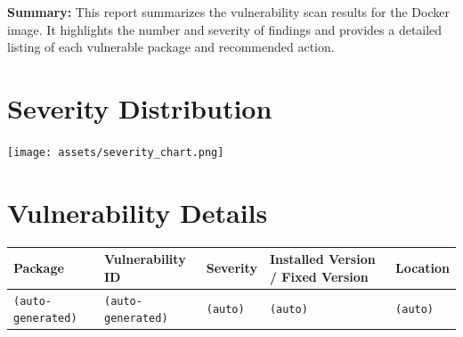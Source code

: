 \documentclass[10pt]{article}
\begin{document}
\vspace{6pt}
\noindent
\textbf{Summary:} This report summarizes the vulnerability scan results for the Docker image. It highlights the number and severity of findings and provides a detailed listing of each vulnerable package and recommended action.

\bigskip

\section*{Severity Distribution}
\begin{center}
  \texttt{[image: assets/severity\_chart.png]}
\end{center}

\bigskip



\section*{Vulnerability Details}
\label{sec:details}


\begin{longtable}{|p{4cm}|p{4cm}|p{2cm}|p{3cm}|p{2.5cm}|}
\hline
\textbf{Package} & \textbf{Vulnerability ID} & \textbf{Severity} & \textbf{Installed Version / Fixed Version} & \textbf{Location} \\
\hline
\endhead

\texttt{(auto-generated)} & \texttt{(auto-generated)} & \texttt{(auto)} & \texttt{(auto)} & \texttt{(auto)} \\
\hline
\end{longtable}

\bigskip

\end{document}
